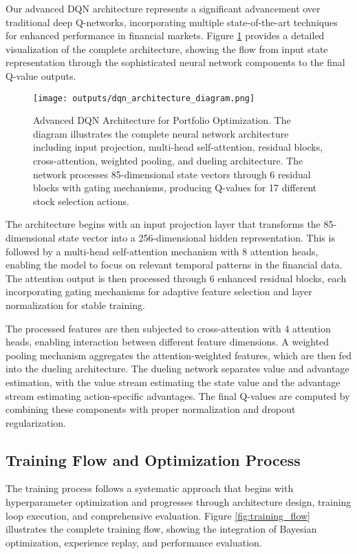 \documentclass[12pt,a4paper]{article}
\begin{document}
Our advanced DQN architecture represents a significant advancement over traditional deep Q-networks, incorporating multiple state-of-the-art techniques for enhanced performance in financial markets. Figure \ref{fig:dqn_architecture} provides a detailed visualization of the complete architecture, showing the flow from input state representation through the sophisticated neural network components to the final Q-value outputs.

\begin{figure}[H]
\centering
\texttt{[image: outputs/dqn\_architecture\_diagram.png]}
\caption{Advanced DQN Architecture for Portfolio Optimization. The diagram illustrates the complete neural network architecture including input projection, multi-head self-attention, residual blocks, cross-attention, weighted pooling, and dueling architecture. The network processes 85-dimensional state vectors through 6 residual blocks with gating mechanisms, producing Q-values for 17 different stock selection actions.}
\label{fig:dqn_architecture}
\end{figure}

The architecture begins with an input projection layer that transforms the 85-dimensional state vector into a 256-dimensional hidden representation. This is followed by a multi-head self-attention mechanism with 8 attention heads, enabling the model to focus on relevant temporal patterns in the financial data. The attention output is then processed through 6 enhanced residual blocks, each incorporating gating mechanisms for adaptive feature selection and layer normalization for stable training.

The processed features are then subjected to cross-attention with 4 attention heads, enabling interaction between different feature dimensions. A weighted pooling mechanism aggregates the attention-weighted features, which are then fed into the dueling architecture. The dueling network separates value and advantage estimation, with the value stream estimating the state value and the advantage stream estimating action-specific advantages. The final Q-values are computed by combining these components with proper normalization and dropout regularization.

\subsection{Training Flow and Optimization Process}

The training process follows a systematic approach that begins with hyperparameter optimization and progresses through architecture design, training loop execution, and comprehensive evaluation. Figure \ref{fig:training_flow} illustrates the complete training flow, showing the integration of Bayesian optimization, experience replay, and performance evaluation.
\end{document}
